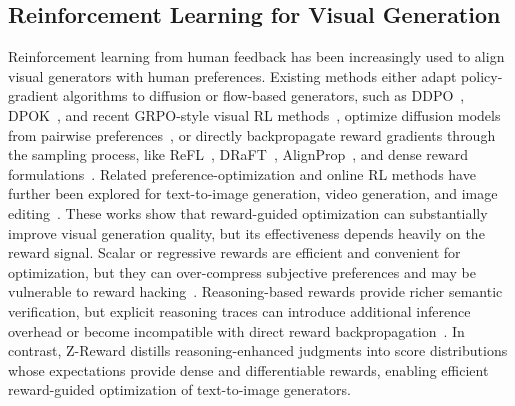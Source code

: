 \documentclass{article}
\newcommand{\mname}{Z-Reward\xspace}
\begin{document}
\subsection{Reinforcement Learning for Visual Generation}
Reinforcement learning from human feedback has been increasingly used to align visual generators with human preferences. Existing methods either adapt policy-gradient algorithms to diffusion or flow-based generators, such as DDPO~\cite{black2024trainingdiffusionmodelsreinforcement}, DPOK~\cite{fan2023dpok}, and recent GRPO-style visual RL methods~\cite{deepseek-math,liu2025improvingvideogenerationhuman,wu2025rewarddancerewardscalingvisual,guo2026leveraging}, optimize diffusion models from pairwise preferences~\cite{rafailov2023direct,wallace2024diffusion}, or directly backpropagate reward gradients through the sampling process, like ReFL~\cite{xu2023imagereward}, DRaFT~\cite{clark2024directlyfinetuningdiffusionmodels}, AlignProp~\cite{prabhudesai2024alignprop}, and dense reward formulations~\cite{yang2024adensereward}. Related preference-optimization and online RL methods have further been explored for text-to-image generation, video generation, and image editing~\cite{liu2025improvingvideogenerationhuman,wu2025rewarddancerewardscalingvisual,guo2026leveraging}. These works show that reward-guided optimization can substantially improve visual generation quality, but its effectiveness depends heavily on the reward signal. Scalar or regressive rewards are efficient and convenient for optimization, but they can over-compress subjective preferences and may be vulnerable to reward hacking~\cite{you2025teachinglargelanguagemodels,guo2026leveraging,gao2023scaling,rafailov2024scaling}. Reasoning-based rewards provide richer semantic verification, but explicit reasoning traces can introduce additional inference overhead or become incompatible with direct reward backpropagation~\cite{yang2026joint,guo2026leveraging}. In contrast, \mname distills reasoning-enhanced judgments into score distributions whose expectations provide dense and differentiable rewards, enabling efficient reward-guided optimization of text-to-image generators.
\end{document}
